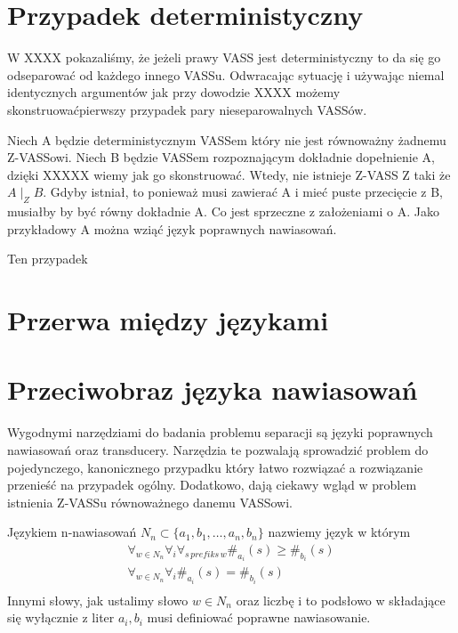     \section{Przypadek deterministyczny}
    W XXXX pokazaliśmy, że jeżeli prawy VASS jest deterministyczny to da się go odseparować od każdego innego VASSu.
    Odwracając sytuację i używając niemal identycznych argumentów jak przy dowodzie XXXX możemy skonstruowaćpierwszy
    przypadek pary nieseparowalnych VASSów.

    \begin{example}
        Niech A będzie deterministycznym VASSem który nie jest równoważny żadnemu Z-VASSowi.
        Niech B będzie VASSem rozpoznającym dokładnie dopełnienie A, dzięki XXXXX wiemy jak go skonstruować.
        Wtedy, nie istnieje Z-VASS Z taki że $A \mid_Z B$.
        Gdyby istniał, to ponieważ musi zawierać A i mieć puste przecięcie z B, musiałby by być równy dokładnie A.
        Co jest sprzeczne z założeniami o A.
        Jako przykładowy A można wziąć język poprawnych nawiasowań.
    \end{example}

    Ten przypadek


    \section{Przerwa między językami}


    \section{Przeciwobraz języka nawiasowań}
    Wygodnymi narzędziami do badania problemu separacji są języki poprawnych nawiasowań oraz transducery.
    Narzędzia te pozwalają sprowadzić problem do pojedynczego, kanonicznego przypadku który łatwo rozwiązać a rozwiązanie
    przenieść na przypadek ogólny.
    Dodatkowo, dają ciekawy wgląd w problem istnienia Z-VASSu równoważnego danemu VASSowi.

    \begin{definition}
        Językiem n-nawiasowań $N_n \subset \{a_1,b_1, \dots , a_n, b_n\}$ nazwiemy język w którym
        \begin{gather*}
            \forall_{w \in N_n} \forall_i \forall_{s \, prefiks \,w} \#_{a_i}(s) \geq \#_{b_i}(s)\\
            \forall_{w \in N_n} \forall_i \#_{a_i}(s) = \#_{b_i}(s)\\
        \end{gather*}
        Innymi słowy, jak ustalimy słowo $w \in N_n$ oraz liczbę i to podsłowo w składające się wyłącznie z liter $a_i,b_i$ musi definiować poprawne nawiasowanie.
    \end{definition}


